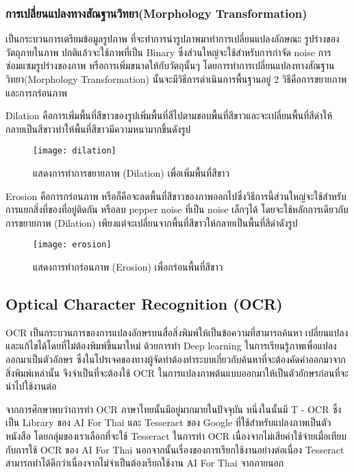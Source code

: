 \subsubsection{การเปลี่ยนแปลงทางสัณฐานวิทยา(Morphology Transformation)}

เป็นกระบวนการเตรียมข้อมูลรูปภาพ  ที่จะทำการนำรูปภาพมาทำการเปลี่ยนแปลงลักษณะ รูปร่างของวัตถุภายในภาพ ปกติแล้วจะใช้ภาพที่เป็น Binary ซึ่งส่วนใหญ่จะใช้สำหรับการกำจัด noise การซ่อมแซมรูปร่างของภาพ หรือการเพิ่มขนาดให้กับวัตถุนั้นๆ โดยการทำการเปลี่ยนแปลงทางสัณฐานวิทยา(Morphology Transformation) นั้นจะมีวิธีการดำเนินการพื้นฐานอยู่ 2 วิธีคือการขยายภาพ และการกร่อนภาพ

Dilation คือการเพิ่มพื้นที่สีขาวของรูปเพิ่มพื้นที่สีไปตามขอบพื้นที่สีขาวและจะเปลี่ยนพื้นที่สีดำให้กลายเป็นสีขาวทำให้พื้นที่สีขาวมีความหนามากขึ้นดังรูป 

\begin{figure}[H]
    \centering
    \texttt{[image: dilation]}
    \caption{แสดงการทำการขยายภาพ  (Dilation) เพื่อเพิ่มพื้นที่สีขาว}\label{fig:Dilation}
\end{figure}

Erosion คือการกร่อนภาพ หรือก็คือจะลดพื้นที่สีขาวของภาพออกไปซึ่งวิธีการนี้ส่วนใหญ่จะใช้สำหรับการแยกสิ่งที่ของที่อยู่ติดกัน หรือลบ pepper noise ที่เป็น noise เล็กๆได้ โดยจะใช้หลักการเดียวกับการขยายภาพ  (Dilation) เพียงแต่จะเปลี่ยนจากพื้นที่สีขาวให้กลายเป็นพื้นที่สีดำดังรูป

\begin{figure}[H]
    \centering
    \texttt{[image: erosion]}
    \caption{แสดงการทำกร่อนภาพ (Erosion) เพื่อกร่อนพื้นที่สีขาว}\label{fig:Erosion}
\end{figure}

\subsection{Optical Character Recognition (OCR)}

OCR เป็นกระบวนการของการแปลงอักษรบนสื่อสิ่งพิมพ์ให้เป็นข้อความที่สามารถค้นหา เปลี่ยนแปลงและแก้ไขได้โดยที่ไม่ต้องพิมพ์ขึ้นมาใหม่ ด้วยการทำ Deep learning ในการเรียนรู้ภาพเพื่อแปลงออกมาเป็นตัวอักษร ซึ่งในโปรเจคของทางผู้จัดทำต้องทำระบบเกี่ยวกับค้นหาที่จะต้องคัดคำออกมาจากสิ่งพิมพ์เหล่านั้น จึงจำเป็นที่จะต้องใช้ OCR ในการแปลงภาพต้นแบบออกมาให้เป็นตัวอักษรก่อนที่จะนำไปใช้งานต่อ

จากการศึกษาพบว่าการทำ OCR ภาษาไทยนั้นมีอยู่มากมายในปัจจุบัน หนึ่งในนั้นมี T - OCR ซึ่งเป็น Library ของ AI For Thai \cite{nectec} และ Tesseract ของ Google \cite{google} ที่ใช้สำหรับแปลงภาพเป็นตัวหนังสือ โดยกลุ่มของเราเลือกที่จะใช้ Tesseract ในการทำ OCR เนื่องจากไม่เสียค่าใช้จ่ายเมื่อเทียบกับการใช้ OCR ของ AI For Thai นอกจากนั้นเรื่องของการเรียกใช้งานอย่างต่อเนื่อง Tesseract สามารถทำได้ดีกว่าเนื่องจากไม่จำเป็นต้องเรียกใช้งาน AI For Thai จากภายนอก

